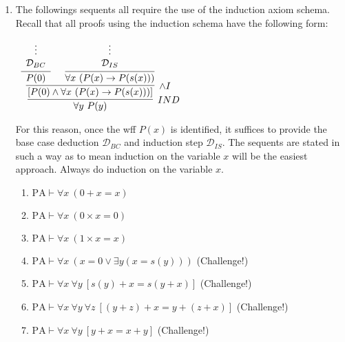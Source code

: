 \documentclass[11pt]{report}
\begin{document}
\begin{enumerate}
	\newpage
	\item The followings sequents all require the use of the induction axiom schema. Recall that all proofs using the induction schema have the following form: 
	
		\begin{mdframed}
			\begin{center}
				$\begin{array}{c}
					\infer[IND]{\forall y \ P(y)}
						{\infer[\land I]{[P(0) \land \forall x \ (P(x) \to P(s(x)))]}
							{\infer[]{P(0)}{\begin{array}{c} \vdots \\ \mathcal{D}_{BC}\end{array}}
							&
							\infer[]{\forall x \ (P(x) \to P(s(x)))}
								{\begin{array}{c} \vdots \\ \mathcal{D}_{IS}\end{array}}}}
				\end{array}$
			\end{center}
		\end{mdframed}

	For this reason, once the wff $P(x)$ is identified, it suffices to provide the base case deduction $\mathcal{D}_{BC}$ and induction step $\mathcal{D}_{IS}$. The sequents are stated in such a way as to mean induction on the variable $x$ will be the easiest approach. Always do induction on the variable $x$.  
	
	\begin{enumerate}
		\item $\text{PA} \vdash \forall x \ (0 + x = x)$
		\item $\text{PA} \vdash \forall x \ (0 \times x = 0)$
		\item $\text{PA} \vdash \forall x \ (1 \times x = x)$
		\item $\text{PA} \vdash \forall x \ (x = 0 \lor \exists y (x = s(y)))$ \hspace{5.2cm} (Challenge!)
		\item $\text{PA} \vdash \forall x \ \forall y \ [s(y) + x = s(y+x)]$ \hspace{5cm} (Challenge!)
		\item $\text{PA} \vdash \forall x \ \forall y \ \forall z \ [(y + z) + x = y + (z + x)]$ \hspace{3.5cm} (Challenge!)
		\item $\text{PA} \vdash \forall x \ \forall y \ [y + x = x + y]$ \hspace{5.98cm} (Challenge!)
	\end{enumerate}


\end{enumerate}
\end{document}
